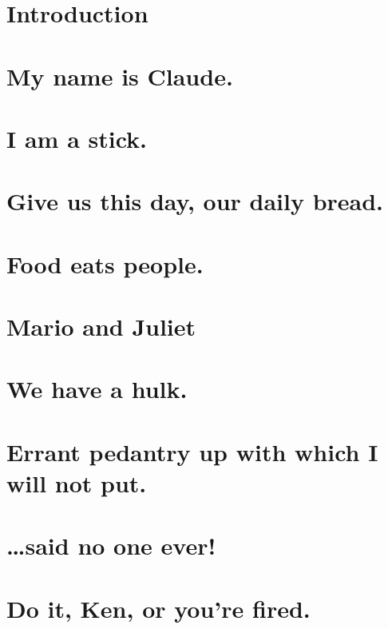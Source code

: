 

\chapter{Introduction} %

\chapter{My name is Claude.} %

\chapter{I am a stick.} %

\chapter{Give us this day, our daily bread.} %

\chapter{Food eats people.} %

\chapter{Mario and Juliet} %

\chapter{We have a hulk.} %

\chapter{Errant pedantry up with which I will not put.} %

\chapter{\ldots{}said no one ever!} %

\chapter{Do it, Ken, or you're fired.} %

